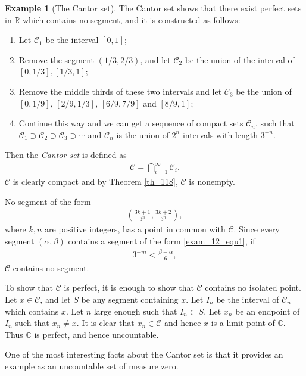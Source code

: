 \documentclass[10pt]{book}
\theoremstyle{definition}
\newtheorem{example}{Example}[chapter]
\numberwithin{equation}{chapter}
\begin{document}
\begin{example}[The Cantor set]
The Cantor set shows that there exist perfect sets in $\mathbb{R}$ which contains no segment, and it is constructed as follows:
\begin{enumerate}[label=(\roman*)]
    \item Let $\mathcal{C}_1$ be the interval $[0,1]$;
    
    \item Remove the segment $\left(1/3,2/3\right)$, and let $\mathcal{C}_2$ be the union of the interval of $\left[0,1/3\right],\left[1/3,1\right]$;
    
    \item Remove the middle thirds of these two intervals and let $\mathcal{C}_3$ be the union of $\left[0,1/9\right]$, $\left[2/9,1/3\right]$, $\left[6/9,7/9\right]$ and $\left[8/9,1\right]$;
    
    \item Continue this way and we can get a sequence of compact sets $\mathcal{C}_n$, such that $\mathcal{C}_1\supset \mathcal{C}_2\supset \mathcal{C}_3\supset\cdots$ and $\mathcal{C}_n$ is the union of $2^n$ intervals with length $3^{-n}$.
\end{enumerate}
Then the {\em Cantor set} is defined as 
\begin{align*}
    \mathcal{C} = \bigcap^\infty_{i=1}\mathcal{C}_i.
\end{align*}
$\mathcal{C}$ is clearly compact and by Theorem \ref{th_118}, $\mathcal{C}$ is nonempty.

No segment of the form
\begin{align}\label{exam_12_equ1}
    \left(\frac{3k+1}{3^n}, \frac{3k+2}{3^n}\right),
\end{align}
where $k,n$ are positive integers, has a point in common with $\mathcal{C}$. Since every segment $(\alpha, \beta)$ contains a segment of the form \eqref{exam_12_equ1}, if 
\begin{align*}
    3^{-m} < \frac{\beta - \alpha}{6},
\end{align*}
$\mathcal{C}$ contains no segment.

To show that $\mathcal{C}$ is perfect, it is enough to show that $\mathcal{C}$ contains no isolated point. Let $x \in \mathcal{C}$, and let $S$ be any segment containing $x$. Let $I_n$ be the interval of $\mathcal{C}_n$ which contains $x$. Let $n$ large enough such that $I_n \subset S$. Let $x_n$ be an endpoint of $I_n$ such that $x_n \neq x$. It is clear that $x_n \in \mathcal{C}$ and hence $x$ is a limit point of $\mathbb{C}$. Thus $\mathbb{C}$ is perfect, and hence uncountable. 

One of the most interesting facts about the Cantor set is that it provides an example as an uncountable set of measure zero.
\end{example}
\end{document}
